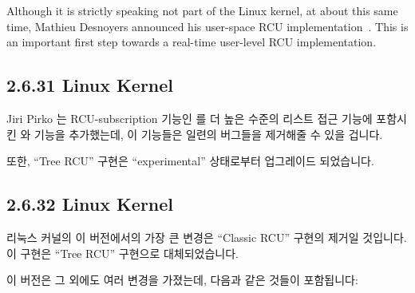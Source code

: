 Although it is strictly speaking not part of the Linux kernel, 
at about this same time, Mathieu Desnoyers announced his user-space
RCU implementation~\cite{MathieuDesnoyers2009URCU}.
This is an important first step towards a real-time user-level RCU
implementation.
\fi

\subsection{2.6.31 Linux Kernel}

Jiri Pirko 는 RCU-subscription 기능인  를 더 높은 수준의
리스트 접근 기능에 포함시킨  와 
기능을 추가했는데, 이 기능들은 일련의 버그들을 제거해줄 수 있을 겁니다.

또한, ``Tree RCU'' 구현은 ``experimental'' 상태로부터 업그레이드 되었습니다.

\subsection{2.6.32 Linux Kernel}

리눅스 커널의 이 버전에서의 가장 큰 변경은 ``Classic RCU'' 구현의 제거일
것입니다.
이 구현은 ``Tree RCU'' 구현으로 대체되었습니다.

이 버전은 그 외에도 여러 변경을 가졌는데, 다음과 같은 것들이 포함됩니다:

